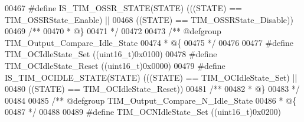 \begin{DoxyCode}
00467 \textcolor{preprocessor}{#}\textcolor{preprocessor}{define} \textcolor{preprocessor}{IS\_TIM\_OSSR\_STATE}\textcolor{preprocessor}{(}\textcolor{preprocessor}{STATE}\textcolor{preprocessor}{)} \textcolor{preprocessor}{(}\textcolor{preprocessor}{(}\textcolor{preprocessor}{(}\textcolor{preprocessor}{STATE}\textcolor{preprocessor}{)} \textcolor{preprocessor}{==} TIM_OSSRState_Enable\textcolor{preprocessor}{)} \textcolor{preprocessor}{||}
00468                                   \textcolor{preprocessor}{(}\textcolor{preprocessor}{(}\textcolor{preprocessor}{STATE}\textcolor{preprocessor}{)} \textcolor{preprocessor}{==} TIM_OSSRState_Disable\textcolor{preprocessor}{)}\textcolor{preprocessor}{)}
00469 \textcolor{comment}{/**}
00470 \textcolor{comment}{  * @\}}
00471 \textcolor{comment}{  */}
00472 
00473 \textcolor{comment}{/** @defgroup TIM\_Output\_Compare\_Idle\_State }
00474 \textcolor{comment}{  * @\{}
00475 \textcolor{comment}{  */}
00476 
00477 \textcolor{preprocessor}{#}\textcolor{preprocessor}{define} \textcolor{preprocessor}{TIM\_OCIdleState\_Set}                \textcolor{preprocessor}{(}\textcolor{preprocessor}{(}\textcolor{preprocessor}{uint16\_t}\textcolor{preprocessor}{)}0x0100\textcolor{preprocessor}{)}
00478 \textcolor{preprocessor}{#}\textcolor{preprocessor}{define} \textcolor{preprocessor}{TIM\_OCIdleState\_Reset}              \textcolor{preprocessor}{(}\textcolor{preprocessor}{(}\textcolor{preprocessor}{uint16\_t}\textcolor{preprocessor}{)}0x0000\textcolor{preprocessor}{)}
00479 \textcolor{preprocessor}{#}\textcolor{preprocessor}{define} \textcolor{preprocessor}{IS\_TIM\_OCIDLE\_STATE}\textcolor{preprocessor}{(}\textcolor{preprocessor}{STATE}\textcolor{preprocessor}{)} \textcolor{preprocessor}{(}\textcolor{preprocessor}{(}\textcolor{preprocessor}{(}\textcolor{preprocessor}{STATE}\textcolor{preprocessor}{)} \textcolor{preprocessor}{==} TIM_OCIdleState_Set\textcolor{preprocessor}{)} \textcolor{preprocessor}{||}
00480                                     \textcolor{preprocessor}{(}\textcolor{preprocessor}{(}\textcolor{preprocessor}{STATE}\textcolor{preprocessor}{)} \textcolor{preprocessor}{==} TIM_OCIdleState_Reset\textcolor{preprocessor}{)}\textcolor{preprocessor}{)}
00481 \textcolor{comment}{/**}
00482 \textcolor{comment}{  * @\}}
00483 \textcolor{comment}{  */}
00484 
00485 \textcolor{comment}{/** @defgroup TIM\_Output\_Compare\_N\_Idle\_State }
00486 \textcolor{comment}{  * @\{}
00487 \textcolor{comment}{  */}
00488 
00489 \textcolor{preprocessor}{#}\textcolor{preprocessor}{define} \textcolor{preprocessor}{TIM\_OCNIdleState\_Set}               \textcolor{preprocessor}{(}\textcolor{preprocessor}{(}\textcolor{preprocessor}{uint16\_t}\textcolor{preprocessor}{)}0x0200\textcolor{preprocessor}{)}

\end{DoxyCode}
